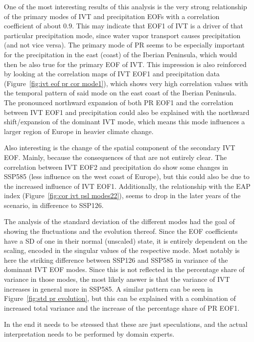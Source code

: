 One of the most interesting results of this analysis is the very strong relationship of the primary modes of IVT and precipitation EOFs with a correlation coefficient of about $0.9$.
This may indicate that EOF1 of IVT is a driver of that particular precipitation mode, since water vapor transport causes precipitation (and not vice versa). 
The primary mode of PR seems to be especially important for the precipitation in the east (coast) of the Iberian Peninsula, which would then be also true for the primary EOF of IVT. 
This impression is also reinforced by looking at the correlation maps of IVT EOF1 and precipitation data (Figure~\ref{fig:ivt eof pr cor mode1}), which shows very high correlation values with the temporal pattern of said mode on the east coast of the Iberian Peninsula. 
The pronounced northward expansion of both PR EOF1 and the correlation between IVT EOF1 and precipitation could also be explained with the northward shift/expansion of the dominant IVT mode, which means this mode influences a larger region of Europe in heavier climate change. 

Also interesting is the change of the spatial component of the secondary IVT EOF. 
Mainly, because the consequences of that are not entirely clear. 
The correlation between IVT EOF2 and precipitation do show some changes in SSP585 (less influence on the west coast of Europe), but this could also be due to the increased influence of IVT EOF1. 
Additionally, the relationship with the EAP index (Figure~\ref{fig:cor ivt psl modes22}), seems to drop in the later years of the scenario, in difference to SSP126. 

The analysis of the standard deviation of the different modes had the goal of showing the fluctuations and the evolution thereof. 
Since the EOF coefficients have a SD of one in their normal (unscaled) state, it is entirely dependent on the scaling, encoded in the singular values of the respective mode.  
Most notably is here the striking difference between SSP126 and SSP585 in variance of the dominant IVT EOF modes. 
Since this is not reflected in the percentage share of variance in those modes, the most likely answer is that the variance of IVT increases in general more in SSP585.
A similar pattern can be seen in Figure~\ref{fig:std pr evolution}, but this can be explained with a combination of increased total variance and the increase of the percentage share of PR EOF1. 

In the end it needs to be stressed that these are just speculations, and the actual interpretation needs to be performed by domain experts. 


